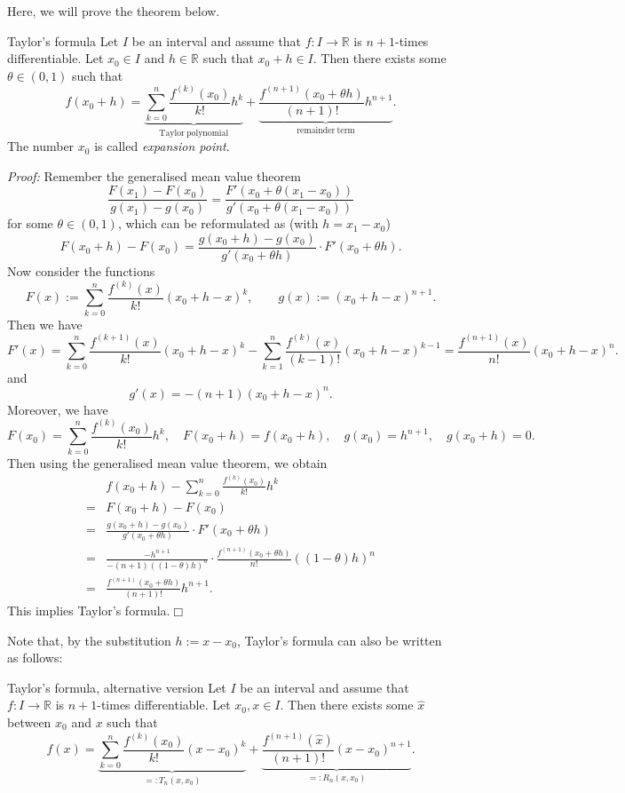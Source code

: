 

Here, we will prove the theorem below.

\begin{Theorem}{Taylor's formula}
    Let $I$ be an interval and assume that $f:I\to\mathbb{R}$ is $n+1$-times differentiable. Let $x_0\in I$ and $h\in\mathbb{R}$ such that $x_0+h\in I$. 
Then there exists some $\theta\in(0,1)$ such that
\[f(x_0+h)=\underbrace{\sum_{k=0}^n\frac{f^{(k)}(x_0)}{k!}h^k}_{\text{Taylor}\ \text{polynomial}}+\underbrace{\frac{f^{(n+1)}(x_0+\theta h)}{(n+1)!}h^{n+1}}_{\text{remainder}\ \text{term}}.\]
The number $x_0$ is called \emph{expansion point}.
\end{Theorem}
{\em Proof:} Remember the generalised mean value theorem
\[\frac{F(x_1)-F(x_0)}{g(x_1)-g(x_0)}=\frac{F'(x_0+\theta(x_1-x_0))}{g'(x_0+\theta(x_1-x_0))}\]
for some $\theta\in(0,1)$,
which can be reformulated as (with $h=x_1-x_0$)
\begin{equation}
F(x_0+h)-F(x_0)=\frac{g(x_0+h)-g(x_0)}{g'(x_0+\theta h)}\cdot F'(x_0+\theta h).\label{eq:genmean}
\end{equation}
Now consider the functions
\[F(x):=\sum_{k=0}^n\frac{f^{(k)}(x)}{k!}(x_0+h-x)^k,\qquad g(x):=(x_0+h-x)^{n+1}.\]
Then we have
\[F'(x)=\sum_{k=0}^n\frac{f^{(k+1)}(x)}{k!}(x_0+h-x)^k-\sum_{k=1}^n\frac{f^{(k)}(x)}{(k-1)!}(x_0+h-x)^{k-1}=\frac{f^{(n+1)}(x)}{n!}(x_0+h-x)^{n}.\]
and
\[g'(x)=-(n+1)(x_0+h-x)^{n}.\]
Moreover, we have
\[F(x_0)=\sum_{k=0}^n\frac{f^{(k)}(x_{0})}{k!}h^k,\quad F(x_0+h)=f(x_0+h),\quad g(x_0)=h^{n+1},\quad g(x_0+h)=0.\]
Then using the generalised mean value theorem, we obtain
\[
\begin{aligned}
&f(x_0+h)- \sum_{k=0}^n\frac{f^{(k)}(x_0)}{k!}h^k\\
=&F(x_0+h)-F(x_0)\\
=&\frac{g(x_0+h)-g(x_0)}{g'(x_0+\theta h)}\cdot F'(x_0+\theta h)\\
=&\frac{-h^{n+1}}{-(n+1)((1-\theta) h)^{n}}\cdot
\frac{f^{(n+1)}(x_0+\theta h)}{n!}((1-\theta) h)^{n}\\
=&\frac{f^{(n+1)}(x_0+\theta h)}{(n+1)!}h^{n+1}.
\end{aligned}
\]
This implies Taylor's formula.$\Box$

Note that, by the substitution $h:=x-x_0$, Taylor's formula can also be written as follows:
\begin{Theorem}{Taylor's formula{,} alternative version}
    Let $I$ be an interval and assume that $f:I\to\mathbb{R}$ is $n+1$-times differentiable. Let $x_0,x\in I$. Then there exists some $\hat{x}$ between $x_0$ and $x$ 
such that
\[f(x)=\underbrace{\sum_{k=0}^n\frac{f^{(k)}(x_0)}{k!}(x-x_0)^k}_{=:T_n(x,x_0)}+\underbrace{\frac{f^{(n+1)}(\hat{x})}{(n+1)!}(x-x_0)^{n+1}}_{=:R_n(x,x_0)}.\]
\end{Theorem}

